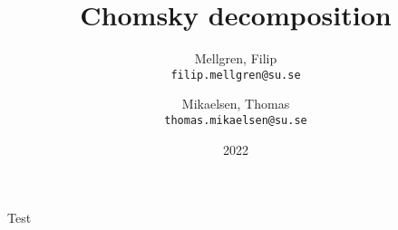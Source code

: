 

\title{Chomsky decomposition}
\author{
	Mellgren, Filip\\
	\texttt{filip.mellgren@su.se}
	\and
	Mikaelsen, Thomas\\
	\texttt{thomas.mikaelsen@su.se}
}
\date{2022}


	
	\maketitle
	
	Test
	
